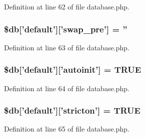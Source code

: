 Definition at line 62 of file database.\-php.

\subsubsection[{\$db}]{\setlength{\rightskip}{0pt plus 5cm}\$db['default']['swap\-\_\-pre'] = ''}\label{development_2database_8php_af35b6847ece1c0a956c97ebb90186e45}


Definition at line 63 of file database.\-php.

\subsubsection[{\$db}]{\setlength{\rightskip}{0pt plus 5cm}\$db['default']['autoinit'] = T\-R\-U\-E}\label{development_2database_8php_a217a1c42eadc83da9cdd9e3d694e53fa}


Definition at line 64 of file database.\-php.

\subsubsection[{\$db}]{\setlength{\rightskip}{0pt plus 5cm}\$db['default']['stricton'] = T\-R\-U\-E}\label{development_2database_8php_a5722ababeee63dd26d82734e3fa83b7c}


Definition at line 65 of file database.\-php.

